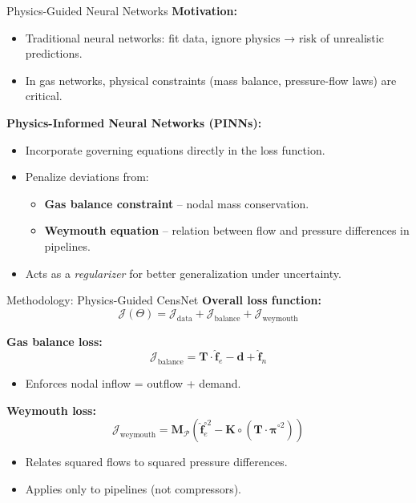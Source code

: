 \documentclass[hyperref={colorlinks,citecolor=blue,linkcolor=blue,urlcolor=blue}]{beamer}
\begin{document}
\begin{frame}{Physics-Guided Neural Networks}
\footnotesize
\textbf{Motivation:}
\begin{itemize}
    \item Traditional neural networks: fit data, ignore physics → risk of unrealistic predictions.
    \item In gas networks, physical constraints (mass balance, pressure-flow laws) are critical.
\end{itemize}

\textbf{Physics-Informed Neural Networks (PINNs):}
\begin{itemize}
    \item Incorporate governing equations directly in the loss function.
    \item Penalize deviations from:
    \begin{itemize}
        \item \textbf{Gas balance constraint} – nodal mass conservation.
        \item \textbf{Weymouth equation} – relation between flow and pressure differences in pipelines.
    \end{itemize}
    \item Acts as a \emph{regularizer} for better generalization under uncertainty.
\end{itemize}

\end{frame}



\begin{frame}{Methodology: Physics-Guided CensNet}
\footnotesize
\textbf{Overall loss function:}
\[
\mathcal{J}(\Theta) =
\mathcal{J}_{\text{data}} +
\mathcal{J}_{\text{balance}} +
\mathcal{J}_{\text{weymouth}}
\]

\textbf{Gas balance loss:}
\[
\mathcal{J}_{\text{balance}} =
\mathbf{T} \cdot \hat{\mathbf{f}}_e - \mathbf{d} + \hat{\mathbf{f}}_n
\]
\begin{itemize}
    \item Enforces nodal inflow = outflow + demand.
\end{itemize}

\textbf{Weymouth loss:}
\[
\mathcal{J}_{\text{weymouth}} =
\mathbf{M}_{\mathcal{P}}
\left( \hat{\mathbf{f}}_e^{\circ 2} -
\mathbf{K} \circ \left(\mathbf{T} \cdot \hat{\boldsymbol{\pi}}^{\circ 2} \right) \right)
\]
\begin{itemize}
    \item Relates squared flows to squared pressure differences.
    \item Applies only to pipelines (not compressors).
\end{itemize}
\end{frame}
\end{document}
